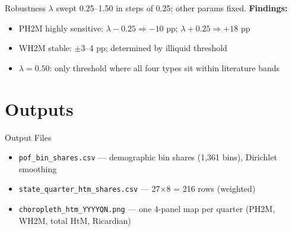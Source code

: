 \documentclass{beamer}
\begin{document}
\begin{frame}{Robustness}
  $\lambda$ swept 0.25--1.50 in steps of 0.25; other params fixed.
  \vspace{0.5em}
  \textbf{Findings:}
  \begin{itemize}
    \item PH2M highly sensitive: $\lambda - 0.25 \Rightarrow -10$ pp; $\lambda + 0.25 \Rightarrow +18$ pp
    \item WH2M stable: $\pm 3$--4 pp; determined by illiquid threshold
    \item $\lambda = 0.50$: only threshold where all four types sit within literature bands
  \end{itemize}
\end{frame}

\section{Outputs}

\begin{frame}{Output Files}
  \begin{itemize}
    \item \texttt{pof\_bin\_shares.csv} --- demographic bin shares (1,361 bins), Dirichlet smoothing
    \item \texttt{state\_quarter\_htm\_shares.csv} --- 27$\times$8 = 216 rows (weighted)
    \item \texttt{choropleth\_htm\_YYYYQN.png} --- one 4-panel map per quarter (PH2M, WH2M, total HtM, Ricardian)
  \end{itemize}
\end{frame}
\end{document}
